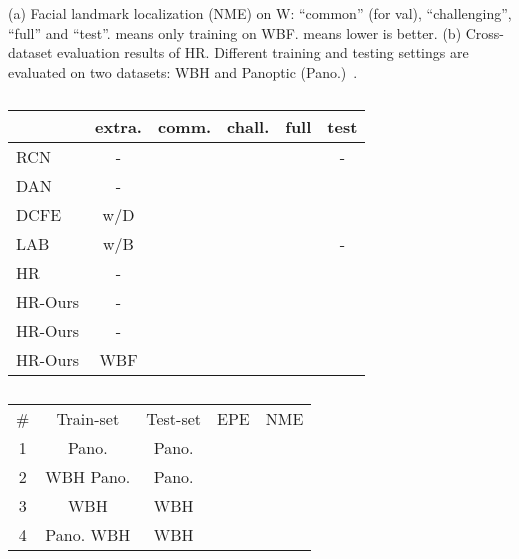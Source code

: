 \documentclass[runningheads]{llncs}
\begin{document}
	\renewcommand{\arraystretch}{1.3}
	\begin{table}[t]
		\caption{(a) Facial landmark localization (NME) on W: ``common'' (for val), ``challenging'', ``full'' and ``test''.  means only training on WBF.  means lower is better. (b) Cross-dataset evaluation results of HR. Different training and testing settings are evaluated on two datasets: WBH and Panoptic (Pano.)~\cite{simon2017hand}.}
		\begin{subtable}[b]{.5\textwidth}
			\centering
			\scriptsize
			\begin{tabular}{ l|ccccc  }
				\hline\noalign{\smallskip}
				& extra. &comm.  & chall.  & full  & test  \\ \hline
				\hline
				RCN \cite{honari2016recombinator} & - &  &  &  &- \\
				DAN \cite{kowalski2017deep} & - &  &  &  & \\
				DCFE \cite{valle2018deeply} & w/D &  &  &  &  \\
				LAB  \cite{wu2018look} & w/B &  &  &  & -\\
				HR~\cite{sun2019high} & -  & &  &  &  \\
				\hline
				HR-Ours & -  &  &  &  &  \\
				HR-Ours & -  & &  &  &  \\ 
				HR-Ours & WBF  & &  &  &  \\
				\hline
			\end{tabular}
			\caption{}
			\label{table:comparison_300w_fullset}
		\end{subtable}
		\quad
		\begin{subtable}[b]{.5\textwidth}
			\scriptsize
			\centering
			\begin{tabular}{c|cc|cc}
				\hline\noalign{\smallskip}
				\#&{Train-set} & {Test-set} & EPE  & NME  \\
				\noalign{\smallskip}
				\hline \hline
				\noalign{\smallskip}
				1&Pano. & Pano.  &  &  \\
				2&WBH  Pano.  & Pano. &  &  \\ \hline
				3&WBH & WBH  &  &  \\
				4&Pano.   WBH & WBH  &  &  \\ \hline
			\end{tabular}
			\caption{}
			\label{tab:panoptic}
		\end{subtable}
		\label{tab:face_and_hand_cross_dataset}
	\end{table}
	
\end{document}
